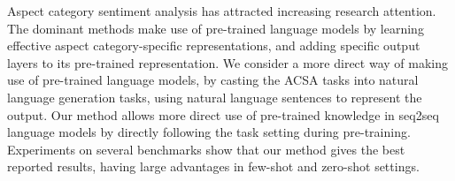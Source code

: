 Aspect category sentiment analysis has attracted increasing research attention. The dominant methods make use of pre-trained language models by learning effective aspect category-specific representations, and adding specific output layers to its pre-trained representation. We consider a more direct way of making use of pre-trained language models, by casting the ACSA tasks into natural language generation tasks, using natural language sentences to represent the output. Our method allows more direct use of pre-trained knowledge in seq2seq language models by directly following the task setting during pre-training. Experiments on several benchmarks show that our method gives the best reported results, having large advantages in few-shot and zero-shot settings.
